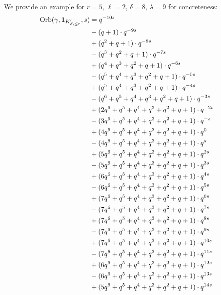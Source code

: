 \begin{example}
  We provide an example for $r=5$, $\ell=2$, $\delta=8$, $\lambda=9$ for concreteness:
  \begin{align*}
    \Orb(\gamma, \mathbf{1}_{K'_{S, \le r}}, s)
    &= q^{-10s} \\
    &- (q + 1) \cdot q^{-9s} \\
    &+ (q^2 + q + 1) \cdot q^{-8s} \\
    &- (q^3 + q^2 + q + 1) \cdot q^{-7s} \\
    &+ (q^4 + q^3 + q^2 + q + 1) \cdot q^{-6s} \\
    &- (q^5 + q^4 + q^3 + q^2 + q + 1) \cdot q^{-5s} \\
    &+ (q^5 + q^4 + q^3 + q^2 + q + 1) \cdot q^{-4s} \\
    &- (q^6 + q^5 + q^4 + q^3 + q^2 + q + 1) \cdot q^{-3s} \\
    &+ (2q^6 + q^5 + q^4 + q^3 + q^2 + q + 1) \cdot q^{-2s} \\
    &- (3q^6 + q^5 + q^4 + q^3 + q^2 + q + 1) \cdot q^{-s} \\
    &+ (4q^6 + q^5 + q^4 + q^3 + q^2 + q + 1) \cdot q^{0} \\
    &- (4q^6 + q^5 + q^4 + q^3 + q^2 + q + 1) \cdot q^{s} \\
    &+ (5q^6 + q^5 + q^4 + q^3 + q^2 + q + 1) \cdot q^{2s} \\
    &- (5q^6 + q^5 + q^4 + q^3 + q^2 + q + 1) \cdot q^{3s} \\
    &+ (6q^6 + q^5 + q^4 + q^3 + q^2 + q + 1) \cdot q^{4s} \\
    &- (6q^6 + q^5 + q^4 + q^3 + q^2 + q + 1) \cdot q^{5s} \\
    &+ (7q^6 + q^5 + q^4 + q^3 + q^2 + q + 1) \cdot q^{6s} \\
    &- (7q^6 + q^5 + q^4 + q^3 + q^2 + q + 1) \cdot q^{7s} \\
    &+ (7q^6 + q^5 + q^4 + q^3 + q^2 + q + 1) \cdot q^{8s} \\
    &- (7q^6 + q^5 + q^4 + q^3 + q^2 + q + 1) \cdot q^{9s} \\
    &+ (7q^6 + q^5 + q^4 + q^3 + q^2 + q + 1) \cdot q^{10s} \\
    &- (7q^6 + q^5 + q^4 + q^3 + q^2 + q + 1) \cdot q^{11s} \\
    &+ (6q^6 + q^5 + q^4 + q^3 + q^2 + q + 1) \cdot q^{12s} \\
    &- (6q^6 + q^5 + q^4 + q^3 + q^2 + q + 1) \cdot q^{13s} \\
    &+ (5q^6 + q^5 + q^4 + q^3 + q^2 + q + 1) \cdot q^{14s} \\

\end{align*}
\end{example}
